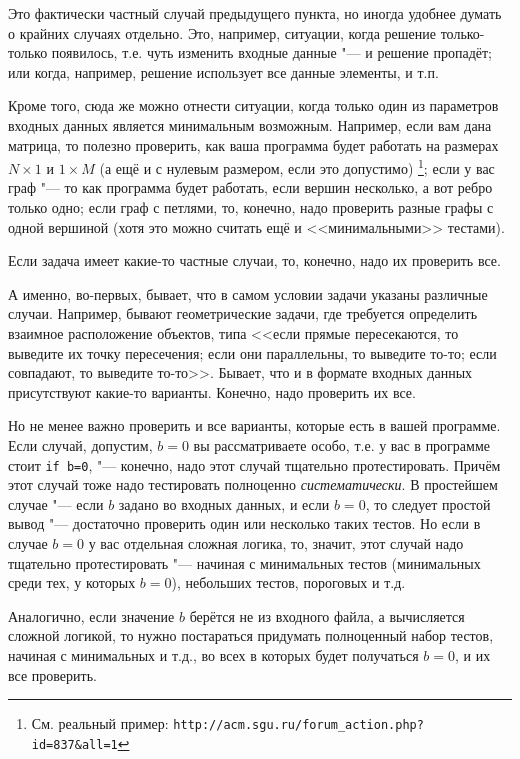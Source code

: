 Это фактически частный случай предыдущего пункта, но иногда удобнее думать о крайних случаях отдельно. 
Это, например, ситуации, когда решение только-только появилось, т.е. чуть изменить входные данные "--- и решение пропадёт; или когда, например,
решение использует все данные элементы, и т.п.

Кроме того, сюда же можно отнести ситуации, когда только один из параметров входных данных является минимальным возможным. 
Например, если вам дана матрица, то полезно проверить, как ваша программа будет работать на размерах $N\times 1$ и $1\times M$ 
(а ещё и с нулевым размером, если это допустимо)%
\footnote{См. реальный пример: \texttt{http://acm.sgu.ru/forum\_action.php?id=837\&all=1}}; 
если у вас граф "--- то как программа будет работать, если вершин несколько, а вот ребро только одно;
если граф с петлями, то, конечно, надо проверить разные графы с одной вершиной (хотя это можно считать ещё и <<минимальными>> тестами).

Если задача имеет какие-то частные случаи, то, конечно, надо их проверить все. 

А именно, во-первых, бывает, что в самом условии задачи указаны различные случаи.
Например, бывают геометрические задачи, где требуется определить взаимное расположение объектов, 
типа <<если прямые пересекаются, то выведите их точку пересечения;
если они параллельны, то выведите то-то; если совпадают, то выведите то-то>>. 
Бывает, что и в формате входных данных присутствуют какие-то варианты.
Конечно, надо проверить их все.

Но не менее важно проверить и все варианты, которые есть в вашей программе. Если случай, допустим, $b=0$ вы рассматриваете особо, 
т.е. у вас в программе стоит \verb`if b=0`, "--- конечно, надо этот случай тщательно протестировать. 
Причём этот случай тоже надо тестировать полноценно \textit{систематически}. 
В простейшем случае "--- если $b$ задано во входных данных, и если $b=0$, то следует простой вывод "--- достаточно проверить один или несколько таких тестов.
Но если в случае $b=0$ у вас отдельная сложная логика, то, значит, этот случай надо тщательно протестировать "--- начиная с минимальных тестов 
(минимальных среди тех, у которых $b=0$), небольших тестов, пороговых и т.д.

Аналогично, если значение $b$ берётся не из входного файла, а вычисляется сложной логикой, то нужно постараться придумать полноценный набор тестов,
начиная с минимальных и т.д., во всех в которых будет получаться $b=0$, и их все проверить.

